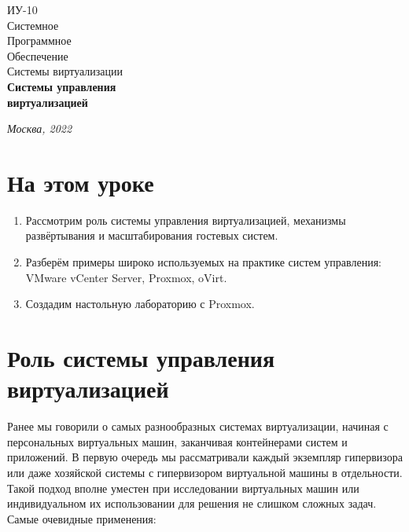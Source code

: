 \documentclass[14pt, a4paper]{article}
\begin{document}
\begin{titlepage}
    \topmargin=216pt
    \newpage
    \hangindent=0.7cm
    \huge ИУ-10\\
    Системное\\
    Программное\\
    Обеспечение\\
    Системы виртуализации\\
    \textbf{Системы
    управления\\
    виртуализацией}

    \vspace{9cm}

    \begin{center}
        \small\textit{Москва, 2022}
    \end{center}
\end{titlepage}

\section*{На этом уроке}
\begin{enumerate}
    \item Рассмотрим роль системы управления виртуализацией, механизмы развёртывания и
    масштабирования гостевых систем.
    \item Разберём примеры широко используемых на практике систем управления: VMware vCenter
    Server, Proxmox, oVirt.
    \item Создадим настольную лабораторию с Proxmox.
\end{enumerate} 

\tableofcontents 
\newpage

\section*{Роль системы управления виртуализацией} 

Ранее мы говорили о самых разнообразных системах виртуализации, начиная с персональных
виртуальных машин, заканчивая контейнерами систем и приложений. В первую очередь мы
рассматривали каждый экземпляр гипервизора или даже хозяйской системы с гипервизором
виртуальной машины в отдельности. Такой подход вполне уместен при исследовании виртуальных
машин или индивидуальном их использовании для решения не слишком сложных задач.\\

Самые очевидные применения:
\end{document}
